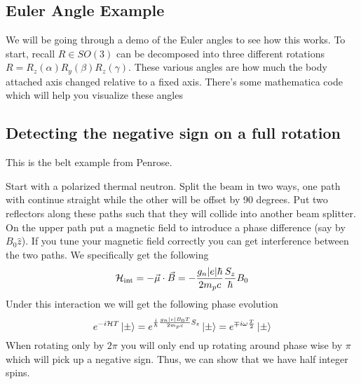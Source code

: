 \subsection{Euler Angle Example}
We will be going through a demo of the Euler angles to see how this works.
To start, recall $R \in SO(3)$ can be decomposed into three different rotations
$R = R_z(\alpha) R_y(\beta) R_z (\gamma)$. These various angles are how much the
body attached axis changed relative to a fixed axis. There's some mathematica code
which will help you visualize these angles

\subsection{Detecting the negative sign on a full rotation}
This is the belt example from Penrose.

Start with a polarized thermal neutron. Split the beam in two ways,
one path with continue straight while the other will be offset by 90 degrees.
Put two reflectors along these paths such that they will collide into another beam
splitter.
On the upper path put a magnetic field to introduce a phase difference (say
by $B_0 \hat{z}$). If you tune your magnetic field correctly you can get
interference between the two paths. We specifically get the following
$$
    \mathcal{H}_{\text{int}} = -\vec{\mu} \cdot \vec{B} =
    - \frac{g_n \abs*{e} \hbar}{2 m_p c} \frac{S_z}{\hbar} B_0
$$
Under this interaction we will get the following phase evolution
$$
    e^{-i \mathcal{H} T} \Ket{\pm} =
    e^{\frac{i}{\hbar} \frac{g_n \abs*{e} B_0 T}{2m_p c} S_z} \Ket{\pm} =
    e^{\mp i \omega \frac{T}{2}} \Ket{\pm}
$$
When rotating only by $2 \pi$ you will only end up rotating around phase wise
by $\pi$ which will pick up a negative sign. Thus, we can show that we have
half integer spins. 
